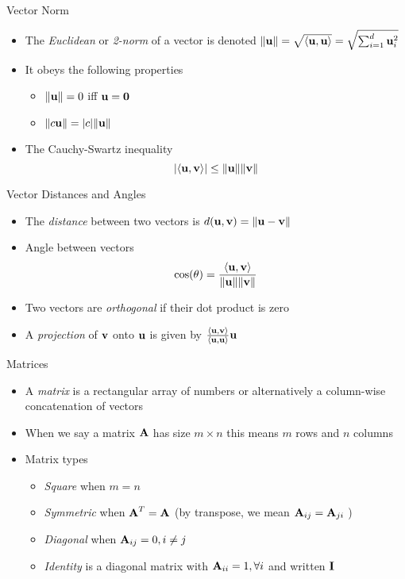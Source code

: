 \documentclass{beamer}
\begin{document}
\begin{frame}{Vector Norm}  
\begin{itemize} 
 \item The \emph{Euclidean} or \emph{2-norm} of a vector is denoted $\|\textbf{u}\| =  \sqrt{\langle \textbf{u}, \textbf{u} \rangle} = \sqrt{\sum_{i=1}^d \textbf{u}_i^2}$
 \item It obeys the following properties	
 \begin{itemize}
 \item  $\|\textbf{u}\| = 0$ iff $\textbf{u} = \textbf{0}$ 
 \item $\|c\textbf{u}\| = |c|\|\textbf{u}\|$
 \end{itemize}
 \item The Cauchy-Swartz inequality
  \begin{displaymath} 
   |\langle \textbf{u}, \textbf{v} \rangle| \leq \|\textbf{u}\|\|\textbf{v}\|
  \end{displaymath}
\end{itemize}
\end{frame}

\begin{frame}{Vector Distances and Angles}  
\begin{itemize} 
 \item The \emph{distance} between two vectors is $d(\textbf{u}, \textbf{v}) = \|\textbf{u} - \textbf{v}\|$ 
 \item Angle between vectors 
 \begin{displaymath} 
  \cos(\theta) = \frac{\langle \textbf{u}, \textbf{v} \rangle}{\|\textbf{u}\|\|\textbf{v}\|}
 \end{displaymath}
 \item Two vectors are \emph{orthogonal} if their dot product is zero 
 \item A \emph{projection} of $\textbf{v}$ onto $\textbf{u}$ is given by $\frac{\langle \textbf{u}, \textbf{v} \rangle}{\langle \textbf{u}, \textbf{u} \rangle}\textbf{u}$   
\end{itemize}
\end{frame} 

\begin{frame}{Matrices} 
\begin{itemize}
 \item A \emph{matrix} is a rectangular array of numbers or alternatively a column-wise concatenation of vectors 
 \item When we say a matrix $\textbf{A}$ has size $m \times n$ this means $m$ rows and $n$ columns 
 \item Matrix types 
 \begin{itemize}
 \item \emph{Square} when $m = n$ 
 \item \emph{Symmetric} when $\textbf{A}^T = \textbf{A}$ (by transpose, we mean $\textbf{A}_{ij} = \textbf{A}_{ji}$ )
 \item \emph{Diagonal} when $\textbf{A}_{ij} = 0, i \neq j$ 
 \item \emph{Identity} is a diagonal matrix with $\textbf{A}_{ii} = 1, \forall i$ and written $\textbf{I}$ 
 \end{itemize}
\end{itemize}
\end{frame}
\end{document}
